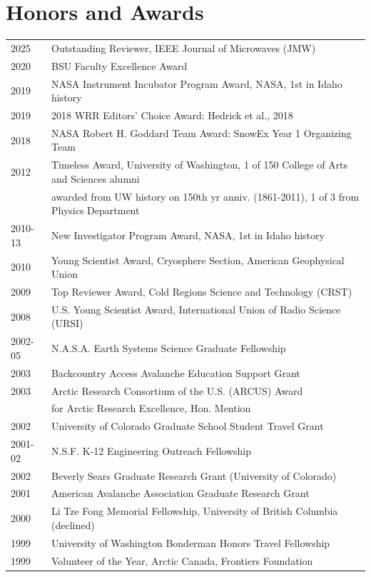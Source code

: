 \documentclass[11pt]{article}
\begin{document}
\section*{Honors and Awards}
\begin{tabular}{ll}
2025 & Outstanding Reviewer, IEEE Journal of Microwaves (JMW) \\
2020 & BSU Faculty Excellence Award \\
2019 & NASA Instrument Incubator Program Award, NASA, 1st in Idaho history \\
2019 & 2018 WRR Editors' Choice Award: Hedrick et al., 2018 \\
2018 & NASA Robert H. Goddard Team Award: SnowEx Year 1 Organizing Team \\
2012 & Timeless Award, University of Washington, 1 of 150 College of Arts and Sciences alumni  \\
& awarded from UW history on 150th yr anniv. (1861-2011), 1 of 3 from Physics Department \\
2010-13 & New Investigator Program Award, NASA, 1st in Idaho history \\
2010 & Young Scientist Award, Cryosphere Section, American Geophysical Union \\
2009 & Top Reviewer Award, Cold Regions Science and Technology (CRST) \\
2008 & U.S. Young Scientist Award, International Union of Radio Science (URSI) \\
2002-05 & N.A.S.A. Earth Systems Science Graduate Fellowship \\
2003 & Backcountry Access Avalanche Education Support Grant \\
2003 & Arctic Research Consortium of the U.S. (ARCUS) Award \\
& for Arctic Research Excellence, Hon. Mention \\
2002 & University of Colorado Graduate School Student Travel Grant \\
2001-02 & N.S.F. K-12 Engineering Outreach Fellowship \\
2002 & Beverly Sears Graduate Research Grant (University of Colorado) \\
2001 & American Avalanche Association Graduate Research Grant \\
2000 & Li Tze Fong Memorial Fellowship, University of British Columbia (declined) \\
1999 & University of Washington Bonderman Honors Travel Fellowship \\
1999 & Volunteer of the Year, Arctic Canada, Frontiers Foundation \\

\end{tabular}
\end{document}
